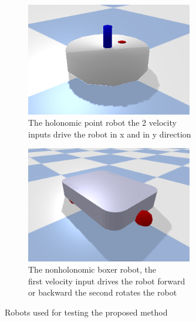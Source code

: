 \begin{figure}[H]
    \centering
    \begin{subfigure}{.5\textwidth}
    \centering
    \includegraphics[width=0.8\textwidth]{figures/point_robot.png}
    \caption{The holonomic point robot the 2 velocity\\inputs drive the robot in \gls{x} and in \gls{y} direction}%
    \label{subfig:example_point_robot}
    \end{subfigure}%
    \begin{subfigure}{.5\textwidth}
    \centering
    \includegraphics[width=0.8\textwidth]{figures/boxer_robot.png}
    \caption{The nonholonomic boxer robot, the\\first velocity input drives the robot forward\\ or backward the second rotates the robot}%
    \label{subfig:example_boxer_robot}
    \end{subfigure}%
    \caption{Robots used for testing the proposed method}%
    \label{fig:example_robots}
\end{figure}

